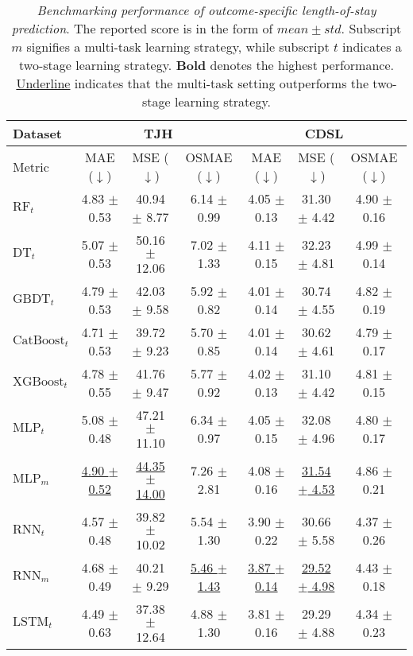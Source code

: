 \begin{table}[htbp]
    \footnotesize
    \centering
    \caption{\textit{Benchmarking performance of outcome-specific length-of-stay prediction}. The reported score is in the form of $mean \pm std$. Subscript $m$ signifies a multi-task learning strategy, while subscript $t$ indicates a two-stage learning strategy. \textbf{Bold} denotes the highest performance. \underline{Underline} indicates that the multi-task setting outperforms the two-stage learning strategy.}
    \label{tab:outcome_specific_los_benchmark}
\begin{tabular}{l|ccc|ccc}
\toprule
Dataset & \multicolumn{3}{c}{TJH} & \multicolumn{3}{|c}{CDSL} \\
\midrule
Metric & MAE ($\downarrow$) & MSE ($\downarrow$) & OSMAE ($\downarrow$) & MAE ($\downarrow$) & MSE ($\downarrow$) & OSMAE ($\downarrow$) \\
\midrule
$\text{RF}_t$ & 4.83 $\pm$ 0.53 & 40.94 $\pm$ 8.77 & 6.14 $\pm$ 0.99 & 4.05 $\pm$ 0.13 & 31.30 $\pm$ 4.42 & 4.90 $\pm$ 0.16 \\ 
$\text{DT}_t$ & 5.07 $\pm$ 0.53 & 50.16 $\pm$ 12.06 & 7.02 $\pm$ 1.33 & 4.11 $\pm$ 0.15 & 32.23 $\pm$ 4.81 & 4.99 $\pm$ 0.14 \\ 
$\text{GBDT}_t$ & 4.79 $\pm$ 0.53 & 42.03 $\pm$ 9.58 & 5.92 $\pm$ 0.82 & 4.01 $\pm$ 0.14 & 30.74 $\pm$ 4.55 & 4.82 $\pm$ 0.19 \\ 
$\text{CatBoost}_t$ & 4.71 $\pm$ 0.53 & 39.72 $\pm$ 9.23 & 5.70 $\pm$ 0.85 & 4.01 $\pm$ 0.14 & 30.62 $\pm$ 4.61 & 4.79 $\pm$ 0.17 \\ 
$\text{XGBoost}_t$ & 4.78 $\pm$ 0.55 & 41.76 $\pm$ 9.47 & 5.77 $\pm$ 0.92 & 4.02 $\pm$ 0.13 & 31.10 $\pm$ 4.42 & 4.81 $\pm$ 0.15 \\ 
\midrule
\midrule
$\text{MLP}_t$ & 5.08 $\pm$ 0.48 & 47.21 $\pm$ 11.10 & 6.34 $\pm$ 0.97 & 4.05 $\pm$ 0.15 & 32.08 $\pm$ 4.96 & 4.80 $\pm$ 0.17 \\ 
$\text{MLP}_m$ & \underline{4.90 $\pm$ 0.52} & \underline{44.35 $\pm$ 14.00} & 7.26 $\pm$ 2.81 & 4.08 $\pm$ 0.16 & \underline{31.54 $\pm$ 4.53} & 4.86 $\pm$ 0.21 \\ 
$\text{RNN}_t$ & 4.57 $\pm$ 0.48 & 39.82 $\pm$ 10.02 & 5.54 $\pm$ 1.30 & 3.90 $\pm$ 0.22 & 30.66 $\pm$ 5.58 & 4.37 $\pm$ 0.26 \\ 
$\text{RNN}_m$ & 4.68 $\pm$ 0.49 & 40.21 $\pm$ 9.29 & \underline{5.46 $\pm$ 1.43} & \underline{3.87 $\pm$ 0.14} & \underline{29.52 $\pm$ 4.98} & 4.43 $\pm$ 0.18 \\ 
$\text{LSTM}_t$ & 4.49 $\pm$ 0.63 & 37.38 $\pm$ 12.64 & 4.88 $\pm$ 1.30 & 3.81 $\pm$ 0.16 & 29.29 $\pm$ 4.88 & 4.34 $\pm$ 0.23 \\ 

\end{tabular}
\end{table}

